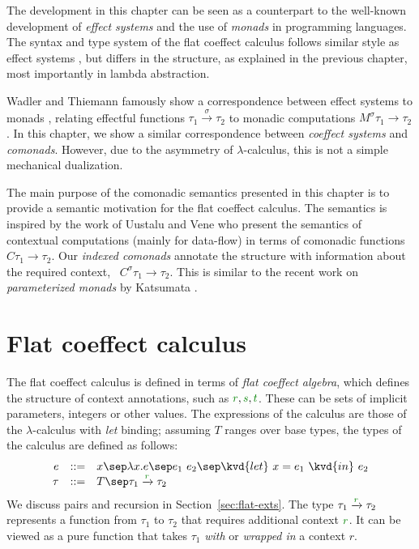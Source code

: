The development in this chapter can be seen as a counterpart to the well-known development of 
\emph{effect systems} \cite{effects-gifford} and the use of \emph{monads} \cite{monad-notions}
in programming languages. The syntax and type system of the flat coeffect calculus follows 
similar style as effect systems \cite{effects-polymorphic,effects-talpin-et-al}, but differs
in the structure, as explained in the previous chapter, most importantly in lambda abstraction.

Wadler and Thiemann famously show a correspondence between effect systems to monads 
\cite{monads-effects-marriage}, relating effectful functions $\tau_1 \xrightarrow{\sigma} \tau_2$ 
to monadic computations $M^\sigma \tau_1 \rightarrow \tau_2$. In this chapter, we show a similar
correspondence between \emph{coeffect systems} and \emph{comonads}. However, due to the asymmetry 
of $\lambda$-calculus, this is not a simple mechanical dualization.

The main purpose of the comonadic semantics presented in this chapter is to provide a semantic
motivation for the flat coeffect calculus. The semantics is inspired by the work of Uustalu and
Vene \cite{comonads-notions} who present the semantics of contextual computations (mainly for
data-flow) in terms of comonadic functions $C \tau_1 \rightarrow \tau_2$. Our \emph{indexed 
comonads} annotate the structure with information about the required context, \ie~$C^\sigma \tau_1 \rightarrow \tau_2$.
This is similar to the recent work on \emph{parameterized monads} by Katsumata \cite{monads-parametric}.


\section{Flat coeffect calculus}
\label{sec:flat-calculus}

The flat coeffect calculus is defined in terms of \emph{flat coeffect algebra}, which defines
the structure of context annotations, such as $\cclrd{r}, \cclrd{s}, \cclrd{t}$. These can be
sets of implicit parameters, integers or other values. The expressions of the calculus are those
of the $\lambda$-calculus with \emph{let} binding; assuming $T$ ranges over base types, the 
types of the calculus are defined as follows:
%
\begin{equation*}
\begin{array}{rcl}
e &::=& x \sep \lambda x.e \sep e_1~e_2 \sep \kvd{let}~x = e_1~\kvd{in}~e_2\\
\tau &::=& T \sep \tau_1 \xrightarrow{\cclrd{r}} \tau_2
\end{array}
\end{equation*}
%
We discuss pairs and recursion in Section~\ref{sec:flat-exts}. The type $\tau_1 \xrightarrow{\cclrd{r}} \tau_2$
represents a function from $\tau_1$ to $\tau_2$ that requires additional context $\cclrd{r}$.
It can be viewed as a pure function that takes $\tau_1$ \emph{with} or \emph{wrapped in} a 
context $r$. 

